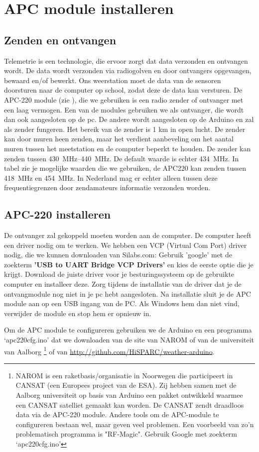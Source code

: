\section{APC module installeren}

\subsection{Zenden en ontvangen} Telemetrie is een technologie, die
ervoor zorgt dat data verzonden en ontvangen wordt. De data wordt
verzonden via radiogolven en door ontvangers opgevangen, bewaard en/of
bewerkt. Ons weerstation moet de data van de sensoren doorsturen naar de
\hisparc computer op school, zodat deze de data kan versturen. De
APC-220 module (zie ), die we gebruiken is een
radio zender of ontvanger met een laag vermogen. Een van de modules
gebruiken we als ontvanger, die wordt dan ook aangesloten op de pc. De
andere wordt aangesloten op de Arduino en zal als zender fungeren. Het
bereik van de zender is 1 km in open lucht. De zender kan door muren heen
zenden, maar het verdient aanbeveling om het aantal muren tussen het
meetstation en de computer beperkt te houden. De zender kan zenden
tussen \SIrange{430}{440}{\MHz}. De default waarde is echter
\SI{434}{\MHz}. In tabel zie je mogelijke waarden die we gebruiken, de APC220
kan zenden tussen \SI{418}{\MHz} en \SI{454}{\MHz}.
In Nederland mag er echter alleen tussen deze frequentiegrenzen door
zendamateurs informatie verzonden worden.


\subsection{APC-220 installeren}
De ontvanger zal gekoppeld moeten worden aan de computer. De computer heeft
een driver nodig om te werken. We hebben een VCP (Virtual Com Port) driver nodig,
die we kunnen downloaden van Silabs.com:
Gebruik 'google' met de zoekterm \textbf{'USB to UART Bridge VCP Drivers'} en kies de eerste
optie die je krijgt.
Download de juiste driver voor je besturingssysteem op de gebruikte computer
en installeer deze. Zorg tijdens de installatie van de driver dat je de
ontvangmodule nog niet in je pc hebt aangesloten.
Na installatie sluit je de APC module  aan op een
USB ingang van de PC. Als Windows hem dan niet vind, verwijder de module en
stop hem er opnieuw in.

Om de APC module te configureren gebruiken we de Arduino en een
programma `apc220cfg.ino' dat we downloaden van de site van NAROM of van
de universiteit van Aalborg \footnote{NAROM is een
raketbasis/organisatie in Noorwegen die participeert in CANSAT (een
Europees project van de ESA). Zij hebben samen met de Aalborg
universiteit op basis van Arduino een pakket ontwikkeld waarmee een
CANSAT satelliet gemaakt kan worden. De CANSAT zendt draadloos data via
de APC-220 module. Andere tools om de APC-module te configureren bestaan
wel, maar geven veel problemen. Een voorbeeld van zo'n problematisch
programma is "RF-Magic". Gebruik Google met zoekterm `apc220cfg.ino'} of
van \url{http://github.com/HiSPARC/weather-arduino}.


